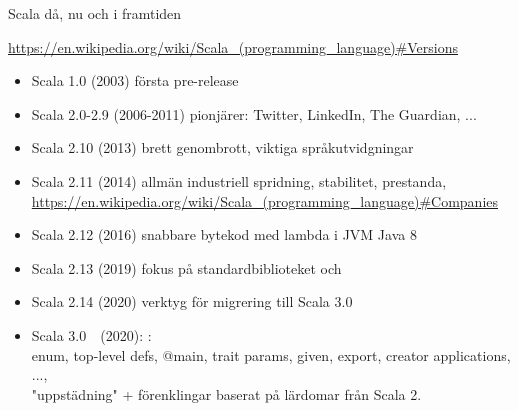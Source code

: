 \begin{Slide}{Scala då, nu och i framtiden}\SlideFontSmall

{\url{
https://en.wikipedia.org/wiki/Scala_(programming_language)#Versions
}}

\begin{itemize}
\item Scala 1.0 (2003) första pre-release
\item Scala 2.0-2.9 (2006-2011) pionjärer: Twitter, LinkedIn, The Guardian, ...
\item Scala 2.10 (2013) brett genombrott, viktiga språkutvidgningar
\item Scala 2.11 (2014) allmän industriell spridning, stabilitet, prestanda, \\
{\url{
https://en.wikipedia.org/wiki/Scala_(programming_language)#Companies
}}
\item Scala 2.12 (2016) snabbare bytekod med lambda i JVM Java 8
\item Scala 2.13 (2019) fokus på standardbiblioteket och 
\item Scala 2.14 (2020) verktyg för migrering till Scala 3.0
\item Scala 3.0~~(2020):  :\\enum, top-level defs, @main, trait params, given, export, creator applications, ...,\\ "uppstädning" + förenklingar baserat på lärdomar från Scala 2.
\end{itemize}
\end{Slide}


